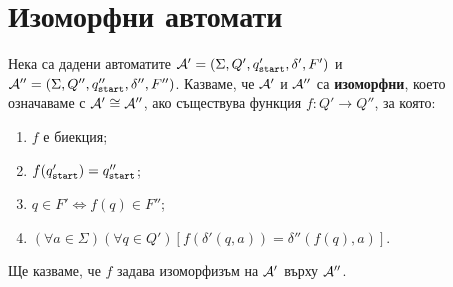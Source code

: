 \section{Изоморфни автомати}
\label{sect:isomorphic}

Нека са дадени автоматите
$\mathcal{A}' = (\Sigma,Q',q_{\texttt{start}}',\delta',F')$ и $\mathcal{A}'' = (\Sigma, Q'', q_{\texttt{start}}'', \delta'', F'')$.
Казваме, че $\mathcal{A}'$ и $\mathcal{A}''$ са {\bf изоморфни}, което означаваме с $\mathcal{A}' \cong \mathcal{A}''$, ако
съществува функция $f: Q'\to Q''$, за която:
\begin{enumerate}[(1)]
\item
  $f$ е биекция;
\item
  $f(q_{\texttt{start}}') = q_{\texttt{start}}''$;
\item
  $q \in F' \iff f(q) \in F''$;
\item
  $(\forall a\in\Sigma)(\forall q\in Q')[f(\delta'(q,a)) = \delta''(f(q),a)]$.
\end{enumerate}
Ще казваме, че $f$ задава изоморфизъм на $\mathcal{A}'$ върху $\mathcal{A}''$.

